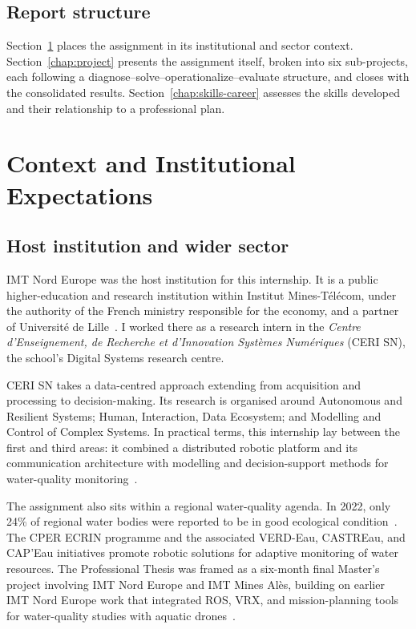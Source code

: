 \documentclass[a4paper,12pt,oneside,openany]{report}
\begin{document}
\section*{Report structure}

Section~\ref{chap:context} places the assignment in its institutional and sector context.
Section~\ref{chap:project} presents the assignment itself, broken into six sub-projects, each
following a diagnose--solve--operationalize--evaluate structure, and closes with the consolidated
results. Section~\ref{chap:skills-career} assesses the skills developed and their relationship to a
professional plan.

\chapter{Context and Institutional Expectations}
\label{chap:context}

\section{Host institution and wider sector}
IMT Nord Europe was the host institution for this internship. It is a public higher-education and
research institution within Institut Mines-T\'el\'ecom, under the authority of the French ministry
responsible for the economy, and a partner of Universit\'e de Lille~\cite{imtneOverview}. I worked
there as a research intern in the \emph{Centre d'Enseignement, de Recherche et d'Innovation
Syst\`emes Num\'eriques} (CERI SN), the school's Digital Systems research centre.

CERI SN takes a data-centred approach extending from acquisition and processing to
decision-making. Its research is organised around Autonomous and Resilient Systems; Human,
Interaction, Data Ecosystem; and Modelling and Control of Complex Systems. In practical
terms, this internship lay between the first and third areas: it combined a distributed robotic
platform and its communication architecture with modelling and decision-support methods for
water-quality monitoring~\cite{imtneCeriSn}.

The assignment also sits within a regional water-quality agenda. In 2022, only 24\% of regional
water bodies were reported to be in good ecological condition~\cite{ceser2022water}. The CPER ECRIN
programme and the associated VERD-Eau, CASTREau, and CAP'Eau initiatives promote robotic solutions
for adaptive monitoring of water resources. The Professional Thesis was framed as a six-month final
Master's project involving IMT Nord Europe and IMT Mines Al\`es, building on earlier IMT Nord Europe
work that integrated ROS, VRX, and mission-planning tools for water-quality studies with aquatic
drones~\cite{internshipBrief2026}.
\end{document}
